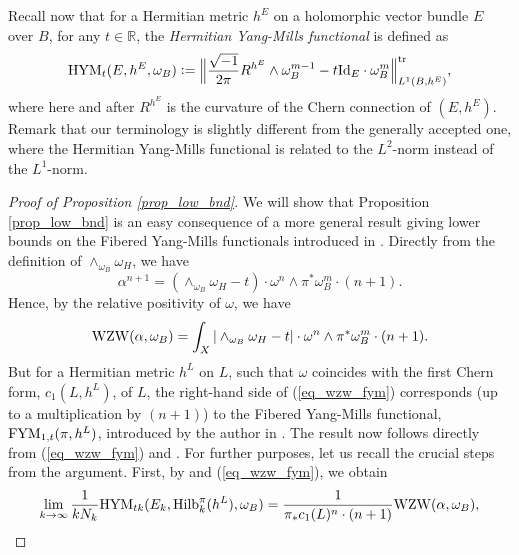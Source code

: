 \documentclass[12pt]{article}
\numberwithin{equation}{section}
\theoremstyle{theorem}
\theoremstyle{definition}
\theoremstyle{remark}
\newcommand{\imun} {\sqrt{-1}}
\newcommand{\real}{\mathbb{R}}
\begin{document}
	\par 
	Recall now that for a Hermitian metric $h^E$ on a holomorphic vector bundle $E$ over $B$, for any $t \in \real$, the \textit{Hermitian Yang-Mills functional} is defined as
	\begin{equation}\label{eq_HYM}
		{\rm{HYM}}_t(E, h^E, \omega_B) 
		:=
		\Big\| \frac{\imun}{2 \pi} R^{h^E} \wedge \omega_B^{m - 1} - t {\rm{Id}}_E \cdot \omega_B^m \Big\|_{L^1(B, h^E)}^{{\rm{tr}}},
	\end{equation}
	where here and after $R^{h^E}$ is the curvature of the Chern connection of $(E, h^E)$.
	Remark that our terminology is slightly different from the generally accepted one, where the Hermitian Yang-Mills functional is related to the $L^2$-norm instead of the $L^1$-norm. 
	\begin{proof}[Proof of Proposition \ref{prop_low_bnd}]
		We will show that Proposition \ref{prop_low_bnd} is an easy consequence of a more general result giving lower bounds on the Fibered Yang-Mills functionals introduced in \cite[Theorem 1.7]{FinHNII}.
		Directly from the definition of $\wedge_{\omega_B} \omega_H$, we have
		\begin{equation}\label{eq_omega_h_wed_defn}
			\alpha^{n + 1} = ( \wedge_{\omega_B} \omega_H - t ) \cdot \omega^n \wedge \pi^* \omega_B^m  \cdot (n + 1).
		\end{equation}
		Hence, by the relative positivity of $\omega$, we have
		\begin{equation}\label{eq_wzw_fym}
			{\rm{WZW}}(\alpha, \omega_B) = \int_X |\wedge_{\omega_B} \omega_H - t| \cdot \omega^n \wedge \pi^* \omega_B^m  \cdot (n + 1).
		\end{equation}
		But for a Hermitian metric $h^L$ on $L$, such that $\omega$ coincides with the first Chern form, $c_1(L, h^L)$, of $L$, the right-hand side of (\ref{eq_wzw_fym}) corresponds (up to a multiplication by $(n + 1)$) to the Fibered Yang-Mills functional, ${\rm{FYM}}_{1, t}(\pi, h^L)$, introduced by the author in \cite[(1.5)]{FinHNII}.
		The result now 	follows directly from (\ref{eq_wzw_fym}) and \cite[Theorem 1.7]{FinHNII}.
		For further purposes, let us recall the crucial steps from the argument.
		First, by \cite[(2.15)]{FinHNII} and (\ref{eq_wzw_fym}), we obtain
		\begin{equation}\label{eq_wzw_hym}
			\lim_{k \to \infty} \frac{1}{k N_k} {\rm{HYM}}_{t k}(E_k, {\rm{Hilb}}_k^{\pi}(h^L), \omega_B)
			=
			\frac{1}{\pi_* c_1(L)^n \cdot (n + 1)} {\rm{WZW}}(\alpha, \omega_B),
		\end{equation}

\end{proof}
\end{document}
